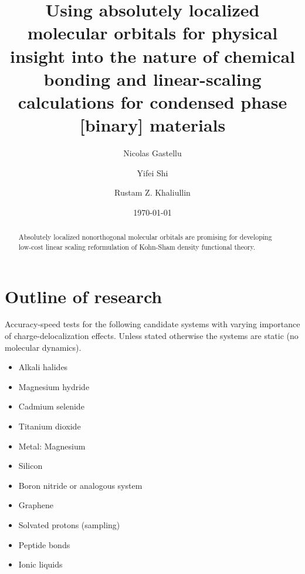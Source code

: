 \documentclass[aps,prb,twocolumn,amsmath,amssymb,superscriptaddress,longbibliography]{revtex4-1}
\begin{document}
\title{
Using absolutely localized molecular orbitals for physical insight into the nature of chemical bonding and linear-scaling calculations for condensed phase [binary] materials 
}

\author{Nicolas Gastellu}
\author{Yifei Shi}
\author{Rustam Z. Khaliullin}

\date{\today}

\begin{abstract}
Absolutely localized nonorthogonal molecular orbitals are promising for developing low-cost linear scaling reformulation of Kohn-Sham density functional theory.
\end{abstract}

\maketitle
 
\section{Outline of research}

Accuracy-speed tests for the following candidate systems with varying importance of charge-delocalization effects. 
Unless stated otherwise the systems are static (no molecular dynamics).

\begin{itemize}
\item Alkali halides
\item Magnesium hydride
\item Cadmium selenide
\item Titanium dioxide
\item Metal: Magnesium
\item Silicon
\item Boron nitride or analogous system
\item Graphene
\item Solvated protons (sampling)
\item Peptide bonds
\item Ionic liquids
\end{itemize}
\end{document}
